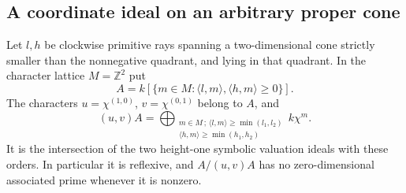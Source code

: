 \subsection{A coordinate ideal on an arbitrary proper cone}
\begin{lemma}
\label{lem:coordinate-ideal-v171}
Let $l,h$ be clockwise primitive rays spanning a two-dimensional
cone strictly smaller than the nonnegative quadrant, and lying in
that quadrant. In the character lattice $M=\mathbb Z^2$ put
\[
 A=k[\{m\in M:\langle l,m\rangle,\langle h,m\rangle\geq0\}].
\]
The characters $u=\chi^{(1,0)}$, $v=\chi^{(0,1)}$ belong to $A$, and
\begin{equation}\label{eq:coordinate-divisorial-v171}
 (u,v)A=\bigoplus_{\substack{m\in M\,;\,
 \langle l,m\rangle\geq\min(l_1,l_2)\\
 \langle h,m\rangle\geq\min(h_1,h_2)}} k\chi^m.
\end{equation}
It is the intersection of the two height-one symbolic valuation
ideals with these orders. In particular it is reflexive, and
$A/(u,v)A$ has no zero-dimensional associated prime whenever it is
nonzero.
\end{lemma}
